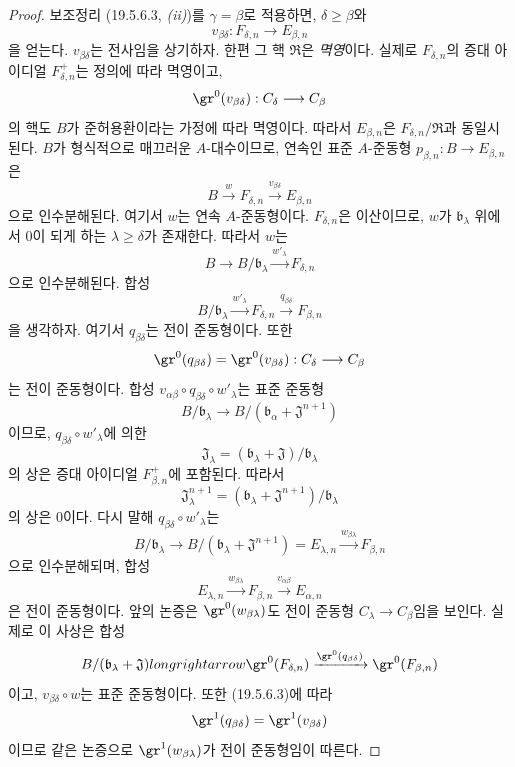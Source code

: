 \begin{proof}
보조정리 (19.5.6.3, \emph{(ii)})를 $\gamma=\beta$로 적용하면,
$\delta\geq\beta$와
\[
  v_{\beta\delta}:F_{\delta,n}\longrightarrow E_{\beta,n}
\]
을 얻는다. $v_{\beta\delta}$는 전사임을 상기하자. 한편 그 핵
$\mathfrak R$은 \emph{멱영}이다. 실제로 $F_{\delta,n}$의 증대 아이디얼
$F_{\delta,n}^+$는 정의에 따라 멱영이고,
\[
  \gr^0(v_{\beta\delta}):C_\delta\longrightarrow C_\beta
\]
의 핵도 $B$가 준허용환이라는 가정에 따라 멱영이다. 따라서
$E_{\beta,n}$은 $F_{\delta,n}/\mathfrak R$과 동일시된다. $B$가
형식적으로 매끄러운 $A$-대수이므로, 연속인 표준 $A$-준동형
$p_{\beta,n}:B\to E_{\beta,n}$은
\[
  B\xrightarrow{w}F_{\delta,n}
  \xrightarrow{v_{\beta\delta}}E_{\beta,n}
\]
으로 인수분해된다. 여기서 $w$는 연속 $A$-준동형이다.
$F_{\delta,n}$은 이산이므로, $w$가 $\mathfrak b_\lambda$ 위에서
$0$이 되게 하는 $\lambda\geq\delta$가 존재한다. 따라서 $w$는
\[
  B\longrightarrow B/\mathfrak b_\lambda
  \xrightarrow{w'_\lambda}F_{\delta,n}
\]
으로 인수분해된다. 합성
\[
  B/\mathfrak b_\lambda\xrightarrow{w'_\lambda}F_{\delta,n}
  \xrightarrow{q_{\beta\delta}}F_{\beta,n}
\]
을 생각하자. 여기서 $q_{\beta\delta}$는 전이 준동형이다. 또한
\[
  \gr^0(q_{\beta\delta})=\gr^0(v_{\beta\delta}):
  C_\delta\longrightarrow C_\beta
\]
는 전이 준동형이다. 합성
$v_{\alpha\beta}\circ q_{\beta\delta}\circ w'_\lambda$는 표준
준동형
\[
  B/\mathfrak b_\lambda\longrightarrow
  B/(\mathfrak b_\alpha+\mathfrak J^{n+1})
\]
이므로, $q_{\beta\delta}\circ w'_\lambda$에 의한
\[
  \mathfrak J_\lambda=
  (\mathfrak b_\lambda+\mathfrak J)/\mathfrak b_\lambda
\]
의 상은 증대 아이디얼 $F_{\beta,n}^+$에 포함된다. 따라서
\[
  \mathfrak J_\lambda^{n+1}=
  (\mathfrak b_\lambda+\mathfrak J^{n+1})/\mathfrak b_\lambda
\]
의 상은 $0$이다. 다시 말해 $q_{\beta\delta}\circ w'_\lambda$는
\[
  B/\mathfrak b_\lambda\longrightarrow
  B/(\mathfrak b_\lambda+\mathfrak J^{n+1})=E_{\lambda,n}
  \xrightarrow{w_{\beta\lambda}}F_{\beta,n}
\]
으로 인수분해되며, 합성
\[
  E_{\lambda,n}\xrightarrow{w_{\beta\lambda}}F_{\beta,n}
  \xrightarrow{v_{\alpha\beta}}E_{\alpha,n}
\]
은 전이 준동형이다. 앞의 논증은
$\gr^0(w_{\beta\lambda})$도 전이 준동형 $C_\lambda\to C_\beta$임을
보인다. 실제로 이 사상은 합성
\[
  B/(\mathfrak b_\lambda+\mathfrak J)longrightarrow
  \gr^0(F_{\delta,n})
  \xrightarrow{\gr^0(q_{\beta\delta})}\gr^0(F_{\beta,n})
\]
이고, $v_{\beta\delta}\circ w$는 표준 준동형이다. 또한
(19.5.6.3)에 따라
\[
  \gr^1(q_{\beta\delta})=\gr^1(v_{\beta\delta})
\]
이므로 같은 논증으로 $\gr^1(w_{\beta\lambda})$가 전이 준동형임이
따른다.
\end{proof}

